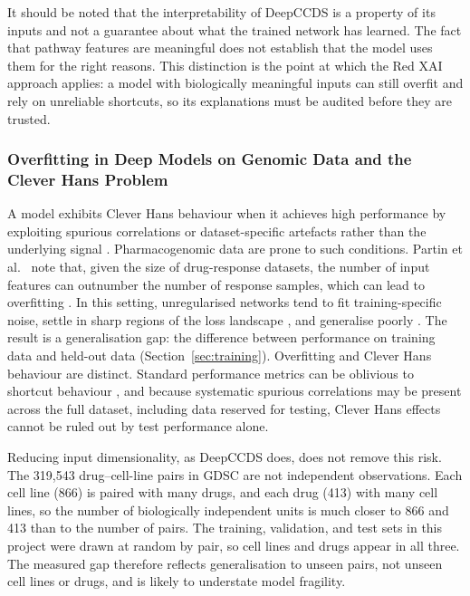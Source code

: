It should be noted that the interpretability of DeepCCDS is a property of its inputs and not a guarantee about what the trained network has learned. The fact that pathway features are meaningful does not establish that the model uses them for the right reasons. This distinction is the point at which the Red XAI approach applies: a model with biologically meaningful inputs can still overfit and rely on unreliable shortcuts, so its explanations must be audited before they are trusted.

\subsubsection{Overfitting in Deep Models on Genomic Data and the Clever Hans Problem}\label{sec:overfitting-clever-hans}

A model exhibits Clever Hans behaviour when it achieves high performance by exploiting spurious correlations or dataset-specific artefacts rather than the underlying signal \citep{lapuschkin2019,anders2022}. Pharmacogenomic data are prone to such conditions. Partin et al.\ \citeyearpar{partin2023} note that, given the size of drug-response datasets, the number of input features can outnumber the number of response samples, which can lead to overfitting \citep{partin2023}. In this setting, unregularised networks tend to fit training-specific noise, settle in sharp regions of the loss landscape \citep{li2018}, and generalise poorly \citep{keskar2017}. The result is a generalisation gap: the difference between performance on training data and held-out data (Section~\ref{sec:training}). Overfitting and Clever Hans behaviour are distinct. Standard performance metrics can be oblivious to shortcut behaviour \citep{lapuschkin2019}, and because systematic spurious correlations may be present across the full dataset, including data reserved for testing, Clever Hans effects cannot be ruled out by test performance alone.

Reducing input dimensionality, as DeepCCDS does, does not remove this risk. The 319,543 drug--cell-line pairs in GDSC are not independent observations. Each cell line (866) is paired with many drugs, and each drug (413) with many cell lines, so the number of biologically independent units is much closer to 866 and 413 than to the number of pairs. The training, validation, and test sets in this project were drawn at random by pair, so cell lines and drugs appear in all three. The measured gap therefore reflects generalisation to unseen pairs, not unseen cell lines or drugs, and is likely to understate model fragility.

